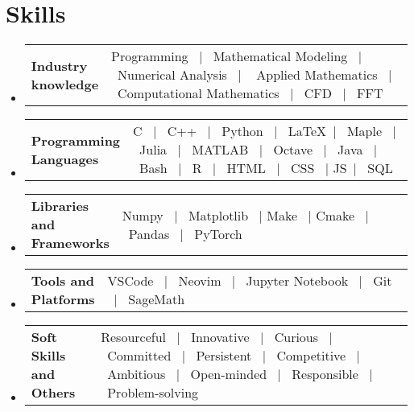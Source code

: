 \documentclass[a4paper,11pt]{article}
\makeatletter
\newcommand{\resumeSectionTypeOne}[2]{
  \item\begin{tabular*}{0.99\textwidth}[t]{
    p{0.18\linewidth}p{0.81\linewidth}
  }
  \textbf{#1} & #2
  \end{tabular*}\vspace{-2pt}
}
\newcommand{\resumeQuadHeading}[4]{
  \item
  \begin{tabular*}{0.96\textwidth}[t]{l@{\extracolsep{\fill}}r}
    \textbf{#1} & \small #2 \\
    \small#3 & \small #4 \\
  \end{tabular*}
}
\newcommand{\resumeHeadingListStart}{
  \begin{itemize}[leftmargin=0.15in, label={}]
}
\newcommand{\resumeHeadingListEnd}{\end{itemize}}
\makeatother
\begin{document}





\section{Skills}
\resumeHeadingListStart{}
\resumeSectionTypeOne{Industry\hspace{1cm} knowledge}{Programming \ $|$ \ Mathematical Modeling \ $|$ \ Numerical Analysis \ $|$ \ \hspace{2cm} Applied Mathematics \ $|$ \ Computational Mathematics  \ $|$ \ CFD \ $|$ \ FFT}
\resumeHeadingListEnd{}

\resumeHeadingListStart{}
\resumeSectionTypeOne{Programming Languages}{C \ $|$ \ C++ \ $|$ \ Python \ $|$ \ \LaTeX \ $|$ \ Maple \ $|$ \ Julia \ $|$ \ MATLAB \ $|$ \ Octave \ $|$ \ Java \ $|$ \ Bash \qquad\ $|$ \ R \ $|$ \ HTML \ $|$ \ CSS \ $|$ JS\ $|$ \ SQL}
\resumeHeadingListEnd{}

\resumeHeadingListStart{}
\resumeSectionTypeOne{Libraries and Frameworks}{Numpy \ $|$ \ Matplotlib \ $|$ Make \ $|$ Cmake \ $|$  \ Pandas \ $|$ \ PyTorch}
\resumeHeadingListEnd{}

\resumeHeadingListStart{}
\resumeSectionTypeOne{Tools and\hspace{0.5cm} Platforms}{VSCode \ $|$ \ Neovim  \ $|$ \ Jupyter Notebook \ $|$ \ Git \ $|$ \ SageMath}
\resumeHeadingListEnd{}

\resumeHeadingListStart{}
\resumeSectionTypeOne{Soft Skills and Others}{Resourceful \ $|$ \ Innovative \ $|$ \ Curious \ $|$ \ Committed \ $|$ \ Persistent \ $|$ \ Competitive \qquad\ $|$ \ Ambitious \ $|$ \ Open-minded \ $|$ \ Responsible \ $|$ \ Problem-solving}
\resumeHeadingListEnd{}

\end{document}
